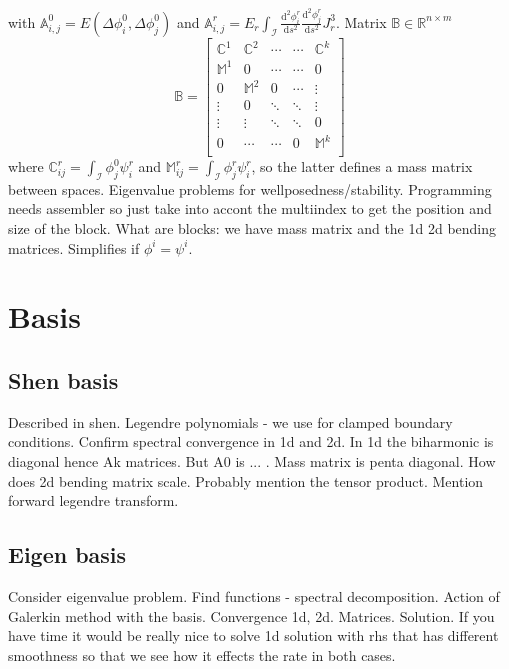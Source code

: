 \documentclass{marine_2015}
\newcommand{\Bmat}{\ensuremath{\mathbb{B}}}
\newcommand{\inner}[2]{\ensuremath{\left(#1, #2\right)}}
\newcommand{\deriv}[2]{\ensuremath{\frac{\mathrm{d}#1}{\mathrm{d}#2}}}
\begin{document}
with $\mathbb{A}^0_{i, j}=E\inner{\Delta \phi^0_i}{\Delta\phi^0_j}$ and
$\mathbb{A}^r_{i, j}=E_r\displaystyle\int_{\mathcal{I}}
\deriv{^2\phi^r_i}{s^2}\deriv{^2\phi^r_j}{s^2}J_r^3$. Matrix
$\Bmat\in\mathbb{R}^{n\times m}$
\[
    \mathbb{B}=
    \begin{bmatrix}
      \mathbb{C}^1 & \mathbb{C}^2 & \cdots & \cdots & \mathbb{C}^k\\
      \mathbb{M}^1   &        0       & \cdots & \cdots &        0      \\
           0         & \mathbb{M}^2   &    0   & \cdots &   \vdots      \\
         \vdots      &       0        & \ddots & \ddots &   \vdots      \\
         \vdots      &     \vdots      & \ddots & \ddots &       0      \\
      0         &  \cdots        & \cdots & 0      &   \mathbb{M}^k     \\
    \end{bmatrix}
\]
where $\mathbb{C}^r_{ij}=\int_{\mathcal{I}}\phi^0_j\psi^r_i$ and
$\mathbb{M}^r_{ij}=\int_{\mathcal{I}}\phi^r_j\psi^r_i$, so the latter defines
a mass matrix between spaces.
Eigenvalue problems for wellposedness/stability. Programming needs assembler
so just take into accont the multiindex to get the position and size of the
block. What are blocks: we have mass matrix and the 1d 2d bending matrices.
Simplifies if $\phi^i=\psi^i$.

\section{Basis}
\label{sec:abstract}
\subsection{Shen basis}
Described in shen. Legendre polynomials - we use for clamped boundary
conditions. Confirm spectral convergence in 1d and 2d. In 1d the biharmonic is
diagonal hence Ak matrices. But A0 is ... . Mass matrix is penta diagonal. How
does 2d bending matrix scale. Probably mention the tensor product. Mention
forward legendre transform.
\subsection{Eigen basis}
Consider eigenvalue problem. Find functions - spectral decomposition. Action of
Galerkin method with the basis. Convergence 1d, 2d. Matrices. Solution. If you
have time it would be really nice to solve 1d solution with rhs that has
different smoothness so that we see how it effects the rate in both cases.
\end{document}
